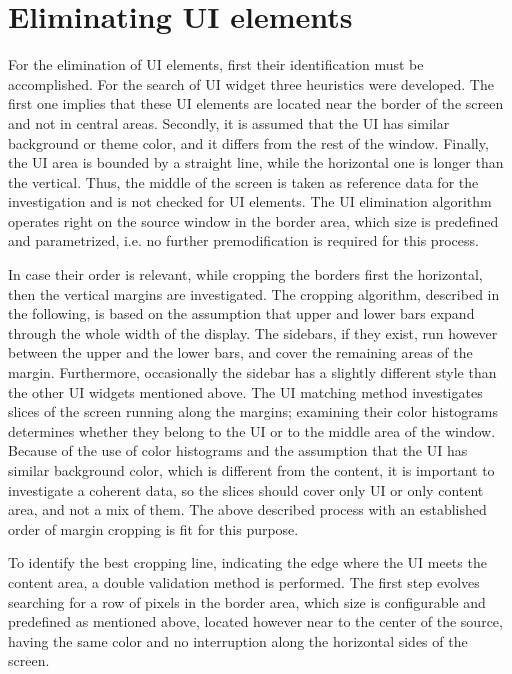 \documentclass[draft,final]{vutinfth} %
\begin{document}
	\section{Eliminating UI elements}
	For the elimination of UI elements, first their identification must be accomplished. 
	For the search of UI widget three heuristics were developed.
	The first one implies that these UI elements are located near the border of the screen and not in central areas.
	Secondly, it is assumed that the UI has similar background or theme color, and it differs from the rest of the window.
	Finally, the UI area is bounded by a straight line, while the horizontal one is longer than the vertical.
	Thus, the middle of the screen is taken as reference data for the investigation and is not checked for UI elements.
	The UI elimination algorithm operates right on the source window in the border area, which size is predefined and parametrized, i.e. no further premodification is required for this process.\par
	In case their order is relevant, while cropping the borders first the horizontal, then the vertical margins are investigated.
	The cropping algorithm, described in the following, is based on the assumption that upper and lower bars expand through the whole width of the display.
	The sidebars, if they exist, run however between the upper and the lower bars, and cover the remaining areas of the margin.
	Furthermore, occasionally the sidebar has a slightly different style than the other UI widgets mentioned above.
	The UI matching method investigates slices of the screen running along the margins; examining their color histograms determines whether they belong to the UI or to the middle area of the window.
	Because of the use of color histograms and the assumption that the UI has similar background color, which is different from the content, it is important to investigate a coherent data, so the slices should cover only UI or only content area, and not a mix of them.
	The above described process with an established order of margin cropping is fit for this purpose. \par 
	To identify the best cropping line, indicating the edge where the UI meets the content area, a double validation method is performed.
	The first step evolves searching for a row of pixels in the border area, which size is configurable and predefined as mentioned above, located however near to the center of the source, having the same color and no interruption along the horizontal sides of the screen.
\end{document}
